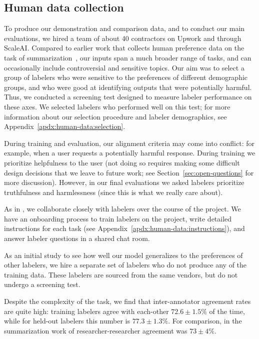 \documentclass{article}
\begin{document}
\subsection{Human data collection}
\label{sec:human-data}

To produce our demonstration and comparison data, and to conduct our main evaluations, we hired a team of about 40 contractors on Upwork and through ScaleAI. Compared to earlier work that collects human preference data on the task of summarization~\citep{ziegler2019fine,stiennon2020learning,wu2021recursively}, our inputs span a much broader range of tasks, and can occasionally include controversial and sensitive topics. Our aim was to select a group of labelers who were sensitive to the preferences of different demographic groups, and who were good at identifying outputs that were potentially harmful. Thus, we conducted a screening test designed to measure labeler performance on these axes. We selected labelers who performed well on this test; for more information about our selection procedure and labeler demographics, see Appendix~\ref{apdx:human-data:selection}. 

During training and evaluation, our alignment criteria may come into conflict: for example, when a user requests a potentially harmful response. During training we prioritize helpfulness to the user (not doing so requires making some difficult design decisions that we leave to future work; see Section~\ref{sec:open-questions} for more discussion). However, in our final evaluations we asked labelers prioritize truthfulness and harmlessness (since this is what we really care about). 

As in \citet{stiennon2020learning}, we collaborate closely with labelers over the course of the project. We have an onboarding process to train labelers on the project, write detailed instructions for each task (see Appendix~\ref{apdx:human-data:instructions}), and answer labeler questions in a shared chat room.

As an initial study to see how well our model generalizes to the preferences of other labelers, we hire a separate set of labelers who do not produce any of the training data. These labelers are sourced from the same vendors, but do not undergo a screening test. 

Despite the complexity of the task, we find that inter-annotator agreement rates are quite high: training labelers agree with each-other $72.6 \pm 1.5\%$ of the time, while for held-out labelers this number is $77.3 \pm 1.3\%$. For comparison, in the summarization work of \citet{stiennon2020learning} researcher-researcher agreement was $73 \pm 4\%$.
\end{document}
